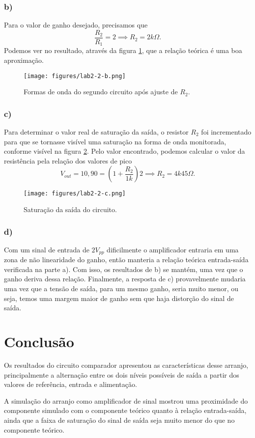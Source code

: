 \documentclass[a4paper]{report}
\begin{document}
\subsubsection*{b)}

Para o valor de ganho desejado, precisamos que \[
\frac{R_2}{R_1} = 2 \implies R_2 = 2k\Omega
.\] Podemos ver no resultado, através da figura \ref{fig:figures-lab2-2-b-png}, que a relação teórica é uma boa aproximação.

\begin{figure}[H]
    \centering
    \texttt{[image: figures/lab2-2-b.png]}
    \caption{Formas de onda do segundo circuito após ajuste de $R_2$.}
    \label{fig:figures-lab2-2-b-png}
\end{figure}

\subsubsection*{c)}

Para determinar o valor real de saturação da saída, o resistor $R_2$ foi incrementado para que se tornasse visível uma saturação na forma de onda monitorada, conforme visível na figura \ref{fig:figures-lab2-2-c-png}. Pelo valor encontrado, podemos calcular o valor da resistência pela relação dos valores de pico \[
    V_{out} = 10,90 = \left( 1 +\frac{R_2}{1k}\right) 2 \implies R_2 = 4k45 \Omega
.\] 

\begin{figure}[H]
    \centering
    \texttt{[image: figures/lab2-2-c.png]}
    \caption{Saturação da saída do circuito.}
    \label{fig:figures-lab2-2-c-png}
\end{figure}

\subsubsection*{d)}

Com um sinal de entrada de $2 V_{pp}$ dificilmente o amplificador entraria em uma zona de não linearidade do ganho, então manteria a relação teórica entrada-saída verificada na parte a). Com isso, os resultados de b) se mantém, uma vez que o ganho deriva dessa relação. Finalmente, a resposta de c) provavelmente mudaria uma vez que a tensão de saída, para um mesmo ganho, seria muito menor, ou seja, temos uma margem maior de ganho sem que haja distorção do sinal de saída.

\section*{Conclusão}

Os resultados do circuito comparador apresentou as características desse arranjo, principalmente a alternação entre os dois níveis possíveis de saída a partir dos valores de referência, entrada e alimentação.

A simulação do arranjo como amplificador de sinal mostrou uma proximidade do componente simulado com o componente teórico quanto à relação entrada-saída, ainda que a faixa de saturação do sinal de saída seja muito menor do que no componente teórico.
\end{document}
